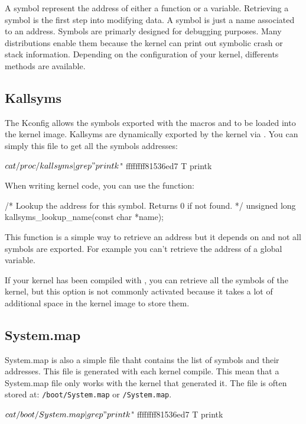 A symbol represent the address of either a function or a variable. Retrieving
a symbol is the first step into modifying data.
A symbol is just a name associated to an address.
Symbols are primarly designed for debugging purposes. Many distributions
enable them because the kernel can print out symbolic crash or stack
information.
Depending on the configuration of your kernel, differents methods are available.

\subsection{Kallsyms}
The Kconfig  allows the symbols exported with the macros
 and  to be loaded into the kernel
image.
Kallsyms are dynamically exported by the kernel via .
You can simply  this file to get all the symbols addresses:\\
\begin{bashcode}
$ cat /proc/kallsyms| grep " printk$"
ffffffff81536ed7 T printk
\end{bashcode}

When writing kernel code, you can use the function:\\
\begin{ccode}
/* Lookup the address for this symbol. Returns 0 if not found. */
unsigned long kallsyms_lookup_name(const char *name);
\end{ccode}

This function is a simple way to retrieve an address but it depends on
 and not all symbols are exported. For example you
can't retrieve the address of a global variable.

If your kernel has been compiled with , you can
retrieve all the symbols of the kernel, but this option is not commonly
activated because it takes a lot of additional space in the kernel image
to store them.

\subsection{System.map}
System.map is also a simple file thaht contains the list of symbols and their
addresses. This file is generated with each kernel compile. This mean that a
System.map file only works with the kernel that generated it.
The file is often stored at: \texttt{/boot/System.map} or \texttt{/System.map}.
\\
\begin{bashcode}
$ cat /boot/System.map | grep " printk$"
ffffffff81536ed7 T printk
\end{bashcode}

